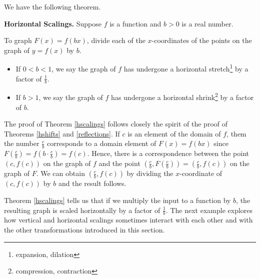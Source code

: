 \documentclass{ximera}
\begin{document}
We have the following theorem.

\smallskip

\colorbox{ResultColor}{\bbm


\begin{theorem}  \label{hscalings}\textbf{Horizontal Scalings.}  Suppose $f$ is a function and $b>0$ is a real number.

To graph $F(x) = f(bx)$, divide each of the $x$-coordinates of the points on the graph of $y=f(x)$ by $b$. 


\begin{itemize}

\item If $0 < b < 1$, we say the graph of $f$ has undergone a horizontal stretch\footnote{expansion, dilation} by a factor of $\frac{1}{b}$. 

\item If $b > 1$, we say the graph of $f$ has undergone a horizontal shrink\footnote{compression, contraction} by a factor of $b$.

\end{itemize}

\end{theorem}

\ebm}

\smallskip

The proof of Theorem \ref{hscalings} follows closely the spirit of the proof of Theorems \ref{hshifts} and \ref{reflections}.  If $c$ is an element of the domain of $f$, them the number $\frac{c}{b}$ corresponds to a domain element of $F(x)= f(bx)$ since $F\left(\frac{c}{b} \right) = f\left( b \cdot \frac{c}{b} \right) = f(c)$.  Hence, there is a correspondence between the point  $(c, f(c))$ on the graph of $f$ and the point $\left( \frac{c}{b}, F\left(\frac{c}{b}\right) \right)= \left( \frac{c}{b}, f(c) \right)$ on the graph of $F$.  We can obtain    $ \left( \frac{c}{b}, f(c) \right)$ by dividing the $x$-coordinate of $(c, f(c))$ by $b$ and the result follows.  

\smallskip

Theorem \ref{hscalings} tells us that if we multiply the input to a function by $b$, the resulting graph is scaled horizontally by a factor of $\frac{1}{b}$.    The next example explores how vertical and horizontal scalings sometimes interact with each other and with the other transformations introduced in this section. 

\smallskip
\end{document}
